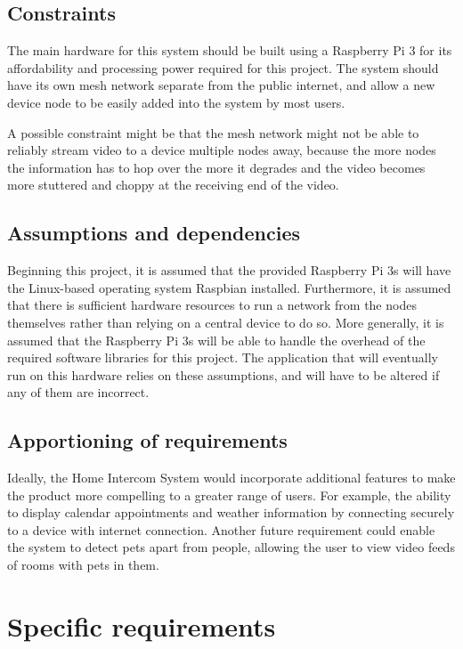 \documentclass[onecolumn, draftclsnofoot,10pt, compsoc]{IEEEtran}
\begin{document}
\subsection{Constraints}
The main hardware for this system should be built using a Raspberry Pi 3 for its affordability and processing power required for this project. The system should have its own mesh network separate from the public internet, and allow a new device node to be easily added into the system by most users.

\noindent A possible constraint might be that the mesh network might not be able to reliably stream video to a device multiple nodes away, because the more nodes the information has to hop over the more it degrades and the video becomes more stuttered and choppy at the receiving end of the video.

\subsection{Assumptions and dependencies}
Beginning this project, it is assumed that the provided Raspberry Pi 3s will have the Linux-based operating system Raspbian installed. Furthermore, it is assumed that there is sufficient hardware resources to run a network from the nodes themselves rather than relying on a central device to do so. More generally, it is assumed that the Raspberry Pi 3s will be able to handle the overhead of the required software libraries for this project. The application that will eventually run on this hardware relies on these assumptions, and will have to be altered if any of them are incorrect. 

\subsection{Apportioning of requirements}
Ideally, the Home Intercom System would incorporate additional features to make the product more compelling to a greater range of users. For example, the ability to display calendar appointments and weather information by connecting securely to a device with internet connection. Another future requirement could enable the system to detect pets apart from people, allowing the user to view video feeds of rooms with pets in them. 

\section{Specific requirements}
\end{document}
